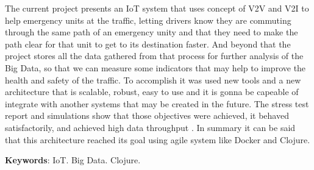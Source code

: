 \setlength{\absparsep}{18pt} %
\begin{resumo}[Abstract]
The current project presents an IoT system that uses concept of V2V and V2I to help emergency units at the traffic, letting drivers know they are commuting through the same path of an emergency unity and that they need to make the path clear for that unit to get to its destination faster. And beyond that the project stores all the data gathered from that process for further analysis of the Big Data, so that we can measure some indicators that may help to improve the health and safety of the traffic. To accomplish it was used new tools and a new architecture that is scalable, robust, easy to use and it is gonna be capeable of integrate with another systems that may be created in the future. The stress test report and simulations show that those objectives were achieved, it behaved satisfactorily, and achieved high data throughput . In summary it can be said that this architecture reached its goal using agile system like Docker and Clojure.

 \textbf{Keywords}: IoT. Big Data. Clojure.
\end{resumo}